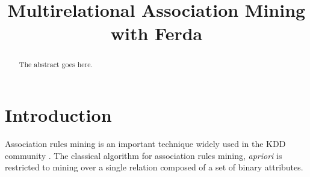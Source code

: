 \documentclass[conference]{IEEEtran}
\begin{document}
\title{Multirelational Association Mining with Ferda}

\author{
}


\maketitle

\begin{abstract}
The abstract goes here.
\end{abstract}


%
\IEEEpeerreviewmaketitle

\section{Introduction}
\label{section:introduction}

Association rules mining is an important technique widely used in the
KDD community \cite{KDNuggets}. The classical algorithm for association rules 
mining, \emph{apriori} \cite{Agrawal2} is restricted to mining over a single 
relation composed of a set of binary attributes. 
\end{document}

